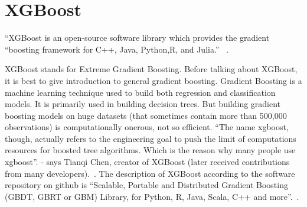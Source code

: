 \section{XGBoost} 

``XGBoost is an open-source software library which provides the
gradient “boosting framework for C++, Java, Python,R, and Julia.''
~\cite{hid-sp18-401-XGBoost-wiki}.

XGBoost stands for Extreme Gradient Boosting. Before talking about
XGBoost, it is best to give introduction to general gradient
boosting. Gradient Boosting is a machine learning technique used to
build both regression and classification models. It is primarily used
in building decision trees. But building gradient boosting models on
huge datasets (that sometimes contain more than 500,000 observations)
is computationally onerous, not so efficient.  ``The name xgboost,
though, actually refers to the engineering goal to push the limit of
computations resources for boosted tree algorithms. Which is the
reason why many people use xgboost''.  - says Tianqi Chen, creator of
XGBoost (later received contributions from many
developers).~\cite{hid-sp18-401-XGBoost-gen}. The description of
XGBoost according to the software repository on github is ``Scalable,
Portable and Distributed Gradient Boosting (GBDT, GBRT or GBM)
Library, for Python, R, Java, Scala, C++ and
more''.~\cite{hid-sp18-401-XGBoost-git}.
